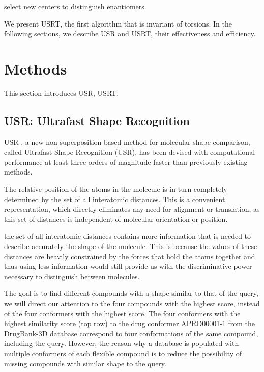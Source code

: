 \documentclass[twocolumn]{svjour3}          %
\begin{document}
\cite{1334,1335} select new centers to distinguish enantiomers.

We present USRT, the first algorithm that is invariant of torsions. In the following sections, we describe USR and USRT, their effectiveness and efficiency.

\section{Methods}

This section introduces USR, USRT.

\subsection{USR: Ultrafast Shape Recognition}

USR \cite{1379,1280}, a new non-superposition based method for molecular shape comparison, called Ultrafast Shape Recognition (USR), has been devised with computational performance at least three orders of magnitude faster than previously existing methods. 

The relative position of the atoms in the molecule is in turn completely determined by the set of all interatomic distances. This is a convenient representation, which directly eliminates any need for alignment or translation, as this set of distances is independent of molecular orientation or position.

the set of all interatomic distances contains more information that is needed to describe accurately the shape of the molecule. This is because the values of these distances are heavily constrained by the forces that hold the atoms together and thus using less information would still provide us with the discriminative power necessary to distinguish between molecules.

The goal is to find different compounds with a shape similar to that of the query, we will direct our attention to the four compounds with the highest score, instead of the four conformers with the highest score. The four conformers with the highest similarity score (top row) to the drug conformer APRD00001-1 from the DrugBank-3D database correspond to four conformations of the same compound, including the query. However, the reason why a database is populated with multiple conformers of each flexible compound is to reduce the possibility of missing compounds with similar shape to the query.
\end{document}
